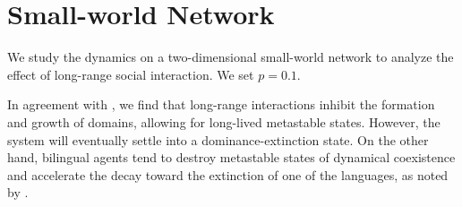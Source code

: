 






\newpage
\section{Small-world Network}
We study the dynamics on a two-dimensional small-world network to analyze the effect of long-range social interaction. We set \(p = 0.1\).

In agreement with \cite{Castello2008}, we find that long-range interactions inhibit the formation and growth of domains, allowing for long-lived metastable states. However, the system will eventually settle into a dominance-extinction state. 
On the other hand, bilingual agents tend to destroy metastable states of dynamical coexistence and accelerate the decay toward the extinction of one of the languages, as noted by \cite{Castell__2006}.





